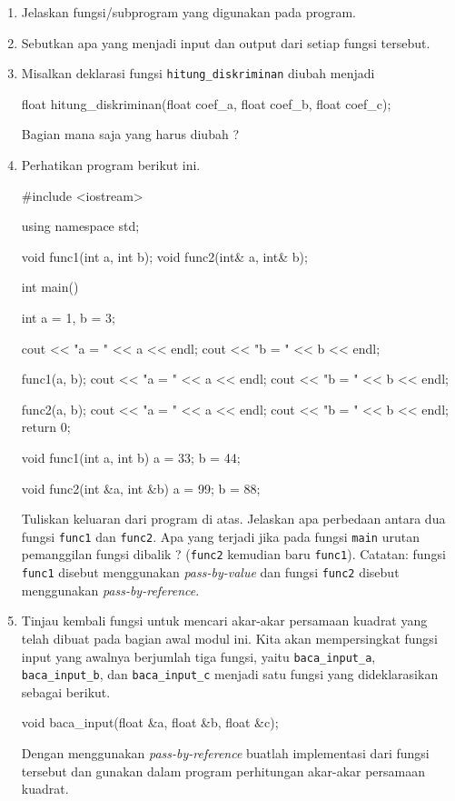 \documentclass[a4paper,11pt]{extarticle}
\begin{document}
\begin{enumerate}
\item Jelaskan fungsi/subprogram yang digunakan pada program.
\item Sebutkan apa yang menjadi input dan output dari setiap fungsi tersebut.
\item Misalkan deklarasi fungsi \texttt{hitung\_diskriminan} diubah menjadi
\begin{cppcode}
float hitung_diskriminan(float coef_a, float coef_b, float coef_c);
\end{cppcode}
Bagian mana saja yang harus diubah ?
%
\item Perhatikan program berikut ini.
\begin{cppcode}
#include <iostream>

using namespace std;

void func1(int a, int b);
void func2(int& a, int& b);

int main()
{
  int a = 1, b = 3;

  cout << "a = " << a << endl;
  cout << "b = " << b << endl;

  func1(a, b);
  cout << "a = " << a << endl;
  cout << "b = " << b << endl;
 
  func2(a, b);
  cout << "a = " << a << endl;
  cout << "b = " << b << endl;
  return 0;
}

void func1(int a, int b)
{
  a = 33;
  b = 44;
}

void func2(int &a, int &b)
{
  a = 99;
  b = 88;
}
\end{cppcode}
%
Tuliskan keluaran dari program di atas. Jelaskan apa perbedaan
antara dua fungsi \texttt{func1} dan \texttt{func2}.
Apa yang terjadi jika pada fungsi \texttt{main} urutan pemanggilan fungsi
dibalik ? (\texttt{func2} kemudian baru \texttt{func1}).
Catatan: fungsi \texttt{func1} disebut menggunakan \textit{pass-by-value}
dan fungsi \texttt{func2} disebut menggunakan \textit{pass-by-reference}.
%
\item Tinjau kembali fungsi untuk mencari akar-akar persamaan kuadrat yang
telah dibuat pada bagian awal modul ini. Kita akan mempersingkat fungsi
input yang awalnya berjumlah tiga fungsi, yaitu \texttt{baca\_input\_a},
\texttt{baca\_input\_b}, dan \texttt{baca\_input\_c} menjadi satu fungsi
yang dideklarasikan sebagai berikut.
\begin{cppcode}
void baca_input(float &a, float &b, float &c);
\end{cppcode}
Dengan menggunakan \textit{pass-by-reference}
buatlah implementasi dari fungsi tersebut dan gunakan dalam
program perhitungan akar-akar persamaan kuadrat.
\end{enumerate}
\end{document}
